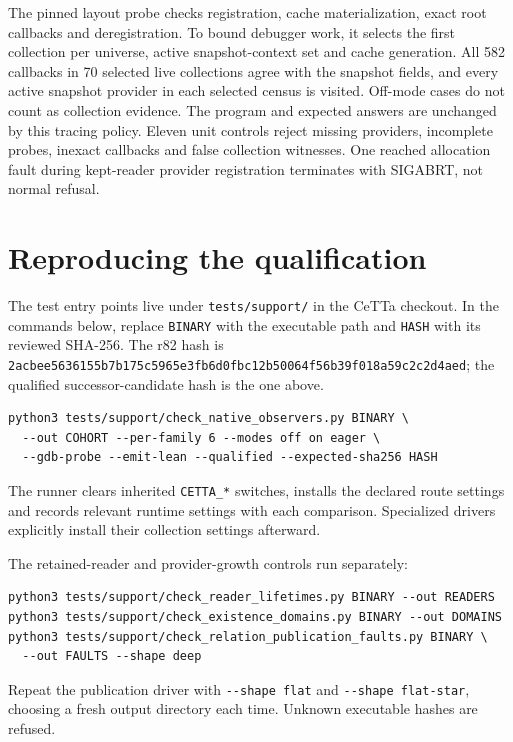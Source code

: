 \documentclass[11pt,a4paper]{article}
\newcommand{\code}[1]{\nolinkurl{#1}}
\begin{document}
The pinned layout probe checks registration, cache materialization, exact
root callbacks and deregistration. To bound debugger work, it selects the
first collection per universe, active snapshot-context set and cache
generation. All 582 callbacks in 70 selected live collections agree with
the snapshot fields, and every active snapshot provider in each selected
census is visited. Off-mode cases do not count as collection evidence.
The program and expected answers are unchanged by this tracing policy.
Eleven unit controls reject missing providers, incomplete probes, inexact
callbacks and false collection witnesses. One reached allocation fault during
kept-reader provider registration terminates with SIGABRT, not normal refusal.

\section{Reproducing the qualification}

The test entry points live under \code{tests/support/} in the CeTTa checkout.
In the commands below, replace \code{BINARY} with the executable path and
\code{HASH} with its reviewed SHA-256. The r82 hash is
\code{2acbee5636155b7b175c5965e3fb6d0fbc12b50064f56b39f018a59c2c2d4aed};
the qualified successor-candidate hash is the one above.
{\small\begin{verbatim}
python3 tests/support/check_native_observers.py BINARY \
  --out COHORT --per-family 6 --modes off on eager \
  --gdb-probe --emit-lean --qualified --expected-sha256 HASH
\end{verbatim}}
The runner clears inherited \code{CETTA_*} switches, installs the declared
route settings and records relevant runtime settings with each comparison.
Specialized drivers explicitly install their collection settings afterward.

The retained-reader and provider-growth controls run separately:
{\small\begin{verbatim}
python3 tests/support/check_reader_lifetimes.py BINARY --out READERS
python3 tests/support/check_existence_domains.py BINARY --out DOMAINS
python3 tests/support/check_relation_publication_faults.py BINARY \
  --out FAULTS --shape deep
\end{verbatim}}
Repeat the publication driver with \verb|--shape flat| and
\verb|--shape flat-star|, choosing a fresh output directory each time.
Unknown executable hashes are refused.
\end{document}
